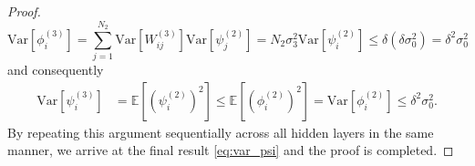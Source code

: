 \documentclass[10pt,a4paper]{amsart}
\begin{document}
\begin{proof}
\begin{equation}
\mathrm{Var}\left[\phi_i^{(3)}\right]
= \textstyle\sum\limits_{j=1}^{N_2}\mathrm{Var}\left[W_{ij}^{(3)}\right]\mathrm{Var}\left[\psi_j^{(2)}\right]
= N_2 \sigma_3^2 \mathrm{Var}\left[\psi_i^{(2)}\right]
\le \delta(\delta \sigma_0^2)= \delta^2 \sigma_0^2
\end{equation}
and consequently
\begin{equation}
\begin{aligned}
\mathrm{Var}\left[\psi_i^{(3)}\right]
&= \mathbb{E}\left[\left(\psi_i^{(2)}\right)^2\right]
\le \mathbb{E}\left[\left(\phi_i^{(2)}\right)^2\right]
= \mathrm{Var}\left[\phi_i^{(2)}\right] 
\leq \delta^2 \sigma_0^2.
\end{aligned}
\end{equation}
By repeating this argument sequentially across all  hidden layers in the same manner, we arrive at the final result \eqref{eq:var_psi} and the proof is completed.
\end{proof}
\end{document}
